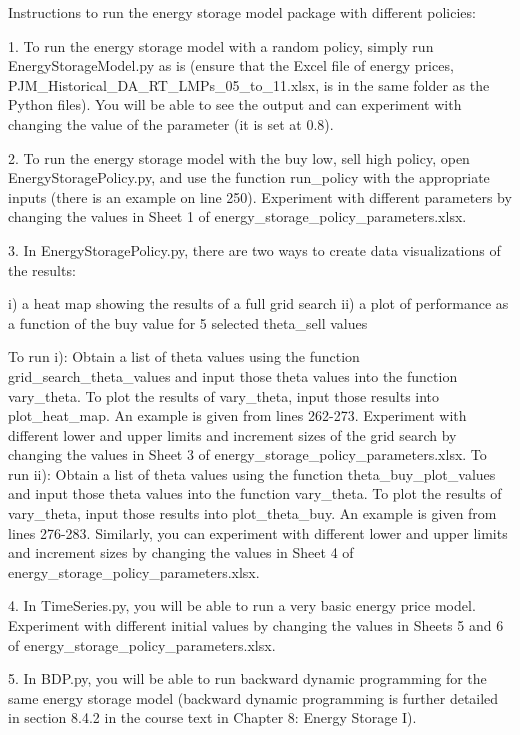 Instructions to run the energy storage model package with different policies:

1. To run the energy storage model with a random policy, simply run EnergyStorageModel.py as is (ensure that the Excel file of energy prices, PJM_Historical_DA_RT_LMPs_05_to_11.xlsx, is in the same folder as the Python files). You will be able to see the output and can experiment with changing the value of the parameter (it is set at 0.8).

2. To run the energy storage model with the buy low, sell high policy, open EnergyStoragePolicy.py, and use the function run_policy with the appropriate inputs (there is an example on line 250). Experiment with different parameters by changing the values in Sheet 1 of energy_storage_policy_parameters.xlsx.

3. In EnergyStoragePolicy.py, there are two ways to create data visualizations of the results:

	i) a heat map showing the results of a full grid search
	ii) a plot of performance as a function of the buy value for 5 selected theta_sell values 

To run i): Obtain a list of theta values using the function grid_search_theta_values and input those theta values into the function vary_theta. To plot the results of vary_theta, input those results into plot_heat_map. An example is given from lines 262-273. Experiment with different lower and upper limits and increment sizes of the grid search by changing the values in Sheet 3 of energy_storage_policy_parameters.xlsx.
To run ii): Obtain a list of theta values using the function theta_buy_plot_values and input those theta values into the function vary_theta. To plot the results of vary_theta, input those results into plot_theta_buy. An example is given from lines 276-283. Similarly, you can experiment with different lower and upper limits and increment sizes by changing the values in Sheet 4 of energy_storage_policy_parameters.xlsx.

4. In TimeSeries.py, you will be able to run a very basic energy price model. Experiment with different initial values by changing the values in Sheets 5 and 6 of energy_storage_policy_parameters.xlsx.

5. In BDP.py, you will be able to run backward dynamic programming for the same energy storage model (backward dynamic programming is further detailed in section 8.4.2 in the course text in Chapter 8: Energy Storage I). 